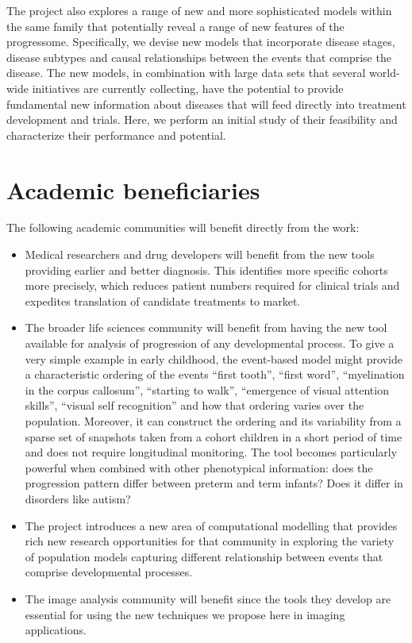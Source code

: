 \documentclass[a4paper,11pt]{article}
\begin{document}
The project also explores a range of new and more sophisticated models
within the same family that potentially reveal a range of new features
of the progressome.  Specifically, we devise new models that
incorporate disease stages, disease subtypes and causal relationships
between the events that comprise the disease.  The new models, in
combination with large data sets that several world-wide initiatives
are currently collecting, have the potential to provide fundamental
new information about diseases that will feed directly into treatment
development and trials.  Here, we perform an initial study of their
feasibility and characterize their performance and potential.

\section*{Academic beneficiaries}

The following academic communities will benefit directly from the
work:

\begin{itemize}

\item Medical researchers and drug developers will benefit from the
new tools providing earlier and better diagnosis.  This identifies
more specific cohorts more precisely, which reduces patient numbers
required for clinical trials and expedites translation of candidate
treatments to market.

\item The broader life sciences community will benefit from having the
new tool available for analysis of progression of any developmental
process.  To give a very simple example in early childhood, the
event-based model might provide a characteristic ordering of the
events ``first tooth'', ``first word'', ``myelination in the corpus
callosum'', ``starting to walk'', ``emergence of visual attention
skills'', ``visual self recognition'' and how that ordering varies
over the population.  Moreover, it can construct the ordering and its
variability from a sparse set of snapshots taken from a cohort
children in a short period of time and does not require longitudinal
monitoring.  The tool becomes particularly powerful when combined with
other phenotypical information: does the progression pattern differ
between preterm and term infants?  Does it differ in disorders like
autism?

\item The project introduces a new area of computational modelling
that provides rich new research opportunities for that community in
exploring the variety of population models capturing different
relationship between events that comprise developmental processes.

\item The image analysis community will benefit since the tools they
develop are essential for using the new techniques we propose here in
imaging applications.

\end{itemize}
\end{document}
